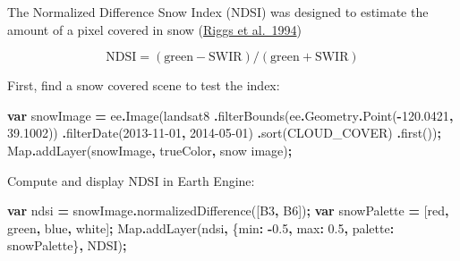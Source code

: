 \documentclass[
]{article}
\newenvironment{Shaded}{\begin{snugshade}}{\end{snugshade}}
\newcommand{\AttributeTok}[1]{\textcolor[rgb]{0.77,0.63,0.00}{#1}}
\newcommand{\BuiltInTok}[1]{#1}
\newcommand{\DataTypeTok}[1]{\textcolor[rgb]{0.13,0.29,0.53}{#1}}
\newcommand{\FloatTok}[1]{\textcolor[rgb]{0.00,0.00,0.81}{#1}}
\newcommand{\FunctionTok}[1]{\textcolor[rgb]{0.00,0.00,0.00}{#1}}
\newcommand{\KeywordTok}[1]{\textcolor[rgb]{0.13,0.29,0.53}{\textbf{#1}}}
\newcommand{\NormalTok}[1]{#1}
\newcommand{\OperatorTok}[1]{\textcolor[rgb]{0.81,0.36,0.00}{\textbf{#1}}}
\newcommand{\StringTok}[1]{\textcolor[rgb]{0.31,0.60,0.02}{#1}}
\begin{document}
The Normalized Difference Snow Index (NDSI) was designed to estimate the amount of a pixel covered in snow (\href{http://ieeexplore.ieee.org/xpls/abs_all.jsp?arnumber=399618\&tag=1}{Riggs et al.~1994})

\[\text{NDSI} = (\text{green} - \text{SWIR}) /(\text{green} + \text{SWIR})\]

First, find a snow covered scene to test the index:

\begin{Shaded}
\begin{Highlighting}[]
\KeywordTok{var}\NormalTok{ snowImage }\OperatorTok{=}\NormalTok{ ee}\OperatorTok{.}\FunctionTok{Image}\NormalTok{(landsat8 }
                         \OperatorTok{.}\FunctionTok{filterBounds}\NormalTok{(ee}\OperatorTok{.}\AttributeTok{Geometry}\OperatorTok{.}\FunctionTok{Point}\NormalTok{(}\OperatorTok{{-}}\FloatTok{120.0421}\OperatorTok{,} \FloatTok{39.1002}\NormalTok{))  }
                         \OperatorTok{.}\FunctionTok{filterDate}\NormalTok{(}\StringTok{\textquotesingle{}2013{-}11{-}01\textquotesingle{}}\OperatorTok{,} \StringTok{\textquotesingle{}2014{-}05{-}01\textquotesingle{}}\NormalTok{)                         }
                         \OperatorTok{.}\FunctionTok{sort}\NormalTok{(}\StringTok{\textquotesingle{}CLOUD\_COVER\textquotesingle{}}\NormalTok{)                         }
                         \OperatorTok{.}\FunctionTok{first}\NormalTok{())}\OperatorTok{;}
\BuiltInTok{Map}\OperatorTok{.}\FunctionTok{addLayer}\NormalTok{(snowImage}\OperatorTok{,}\NormalTok{ trueColor}\OperatorTok{,} \StringTok{\textquotesingle{}snow image\textquotesingle{}}\NormalTok{)}\OperatorTok{;}  
\end{Highlighting}
\end{Shaded}

Compute and display NDSI in Earth Engine:

\begin{Shaded}
\begin{Highlighting}[]
\KeywordTok{var}\NormalTok{ ndsi }\OperatorTok{=}\NormalTok{ snowImage}\OperatorTok{.}\FunctionTok{normalizedDifference}\NormalTok{([}\StringTok{\textquotesingle{}B3\textquotesingle{}}\OperatorTok{,} \StringTok{\textquotesingle{}B6\textquotesingle{}}\NormalTok{])}\OperatorTok{;}      
\KeywordTok{var}\NormalTok{ snowPalette }\OperatorTok{=}\NormalTok{ [}\StringTok{\textquotesingle{}red\textquotesingle{}}\OperatorTok{,} \StringTok{\textquotesingle{}green\textquotesingle{}}\OperatorTok{,} \StringTok{\textquotesingle{}blue\textquotesingle{}}\OperatorTok{,} \StringTok{\textquotesingle{}white\textquotesingle{}}\NormalTok{]}\OperatorTok{;}   
\BuiltInTok{Map}\OperatorTok{.}\FunctionTok{addLayer}\NormalTok{(ndsi}\OperatorTok{,}              
\NormalTok{             \{}\DataTypeTok{min}\OperatorTok{:} \OperatorTok{{-}}\FloatTok{0.5}\OperatorTok{,} \DataTypeTok{max}\OperatorTok{:} \FloatTok{0.5}\OperatorTok{,}  \DataTypeTok{palette}\OperatorTok{:}\NormalTok{ snowPalette\}}\OperatorTok{,}              
             \StringTok{\textquotesingle{}NDSI\textquotesingle{}}\NormalTok{)}\OperatorTok{;}  
\end{Highlighting}
\end{Shaded}
\end{document}
